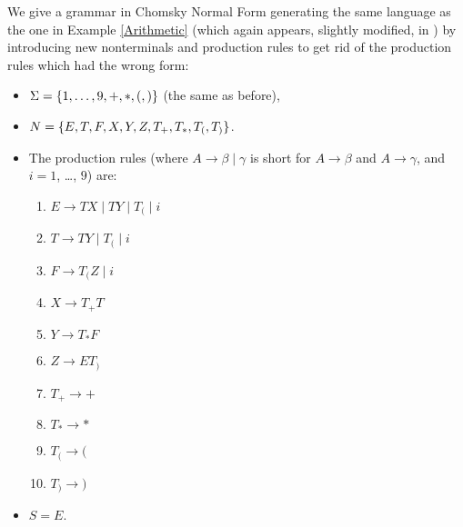 \begin{Example}
  \label{CNF-Ex}
  We give a grammar in Chomsky Normal Form generating the same language as the one in Example \ref{Arithmetic} (which again appears, slightly modified, in \citep{Lange-Leiss}) by introducing new nonterminals and production rules to get rid of the production rules which had the wrong form:
  \begin{itemize}
  \item $\Sigma = \{1,\ldots , 9, +, *, (, )\}$ (the same as before),
  \item $N = \{E, T, F, X, Y, Z, T_+, T_*, T_(, T_)\}$.
  \item The production rules (where $A \to \beta \mid \gamma$ is short for $A \to \beta$ and $A \to \gamma$, and $i = 1$, \ldots,  $9$) are:
    \begin{enumerate}
    \item$E  \to  TX \mid TY \mid T_( \mid i$
    \item$T  \to  TY \mid T_( \mid i$
    \item$F  \to  T_(Z \mid i$
    \item$X  \to  T_+T$
    \item$Y  \to  T_*F$
    \item$Z  \to  ET_)$
    \item$T_+ \to +$
    \item$T_* \to *$
    \item$T_( \to ($
    \item$T_) \to )$
    \end{enumerate}
  \item $S = E$.
  \end{itemize}
\end{Example}
